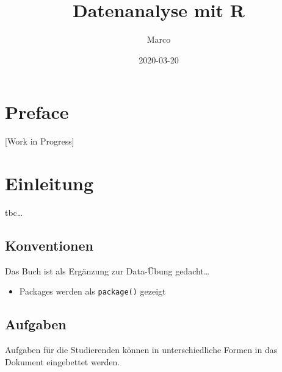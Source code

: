 \documentclass[
]{book}
\title{Datenanalyse mit R}
\author{Marco}
\date{2020-03-20}
\providecommand{\tightlist}{%
  \setlength{\itemsep}{0pt}\setlength{\parskip}{0pt}}
\begin{document}
\maketitle

{
\setcounter{tocdepth}{1}
\tableofcontents
}
\hypertarget{preface}{%
\chapter*{Preface}\label{preface}}

{[}Work in Progress{]}

\hypertarget{einleitung}{%
\chapter*{Einleitung}\label{einleitung}}

tbc\ldots{}

\hypertarget{konventionen}{%
\section*{Konventionen}\label{konventionen}}

Das Buch ist als Ergänzung zur Data-Übung gedacht\ldots{}

\begin{itemize}
\tightlist
\item
  Packages werden als \texttt{package()} gezeigt
\end{itemize}

\hypertarget{aufgaben}{%
\section*{Aufgaben}\label{aufgaben}}

Aufgaben für die Studierenden können in unterschiedliche Formen in das Dokument eingebettet werden.
\end{document}
